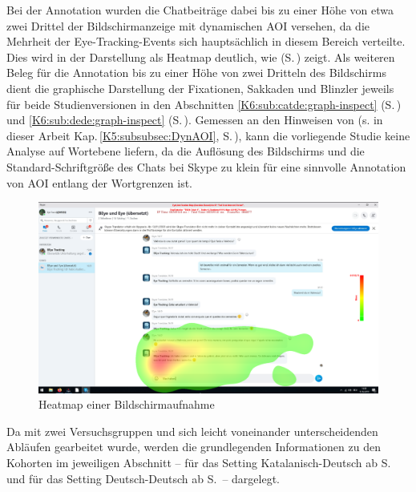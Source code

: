 Bei der Annotation wurden die Chatbeiträge dabei bis zu einer Höhe von etwa zwei Drittel der Bildschirmanzeige mit dynamischen AOI versehen, da die Mehrheit der Eye-Tracking-Events sich hauptsächlich in diesem Bereich verteilte. Dies wird in der Darstellung als Heatmap  deutlich, wie  (S.\,\pageref{K5:fig:Heatmap-TN24}) zeigt. Als weiteren Beleg für die Annotation bis zu einer Höhe von zwei Dritteln des Bildschirms dient die graphische Darstellung der Fixationen, Sakkaden und Blinzler jeweils für beide Studienversionen in den Abschnitten \ref{K6:sub:catde:graph-inspect} (S.\,\pageref{K6:sub:catde:graph-inspect}) und \ref{K6:sub:dede:graph-inspect} (S.\,\pageref{K6:sub:dede:graph-inspect}). Gemessen an den Hinweisen von \citeauthor{obrien_eye_2009} (s. in dieser Arbeit Kap.\,\ref{K5:subsubsec:DynAOI}, S.\,\pageref{K5:subsubsec:DynAOI}), kann die vorliegende Studie keine Analyse auf Wortebene liefern, da die Auflösung des Bildschirms und die Standard-Schriftgröße des Chats bei Skype zu klein für eine sinnvolle Annotation von AOI entlang der Wortgrenzen ist.


\begin{figure}
    \includegraphics[width=\textwidth]{Figures/Fixmaps/CatDe/Fixmap_TN24_Trial_1.png}
	\caption{Heatmap einer Bildschirmaufnahme\label{K5:fig:Heatmap-TN24}}
\end{figure}




Da mit zwei Versuchsgruppen und sich leicht voneinander unterscheidenden Abläufen gearbeitet wurde, werden die grundlegenden Informationen zu den Kohorten im jeweiligen Abschnitt -- für das Setting Katalanisch-Deutsch ab S.\,\pageref{K6:subsec:Angaben-Eingang-Probandinnen-CatDe} und für das Setting Deutsch-Deutsch ab S.\,\pageref{K6:subsec:Angaben-Eingang-Probandinnen-DeDe} -- dargelegt.

